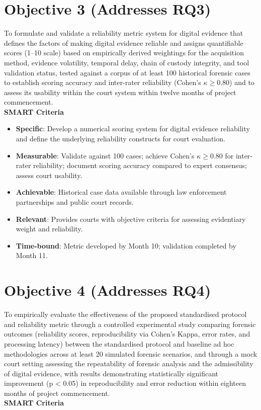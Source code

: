 \documentclass[a4paper]{report}
\begin{document}
\begin{justify}
\section{Objective 3 (Addresses RQ3)}

To formulate and validate a reliability metric system for digital evidence that defines the factors of making digital evidence reliable and assigns quantifiable scores (1–10 scale) based on empirically derived weightings for the acquisition method, evidence volatility, temporal delay, chain of custody integrity, and tool validation status, tested against a corpus of at least 100 historical forensic cases to establish scoring accuracy and inter-rater reliability (Cohen’s $\kappa \geq 0.80$) and to assess its usability within the court system within twelve months of project commencement.
\\
\textbf{SMART Criteria}

\begin{itemize}
    \item \textbf{Specific}: Develop a numerical scoring system for digital evidence reliability and define the underlying reliability constructs for court evaluation.
    \item \textbf{Measurable}: Validate against 100 cases; achieve Cohen’s $\kappa \geq 0.80$ for inter-rater reliability; document scoring accuracy compared to expert consensus; assess court usability.
    \item \textbf{Achievable}: Historical case data available through law enforcement partnerships and public court records.
    \item \textbf{Relevant}: Provides courts with objective criteria for assessing evidentiary weight and reliability.
    \item \textbf{Time-bound}: Metric developed by Month 10; validation completed by Month 11.
\end{itemize}

\section{Objective 4 (Addresses RQ4)}

To empirically evaluate the effectiveness of the proposed standardised protocol and reliability metric through a controlled experimental study comparing forensic outcomes (reliability scores, reproducibility via Cohen’s Kappa, error rates, and processing latency) between the standardised protocol and baseline ad hoc methodologies across at least 20 simulated forensic scenarios, and through a mock court setting assessing the repeatability of forensic analysis and the admissibility of digital evidence, with results demonstrating statistically significant improvement (p < 0.05) in reproducibility and error reduction within eighteen months of project commencement.
\\
\textbf{SMART Criteria}


\end{justify}
\end{document}
